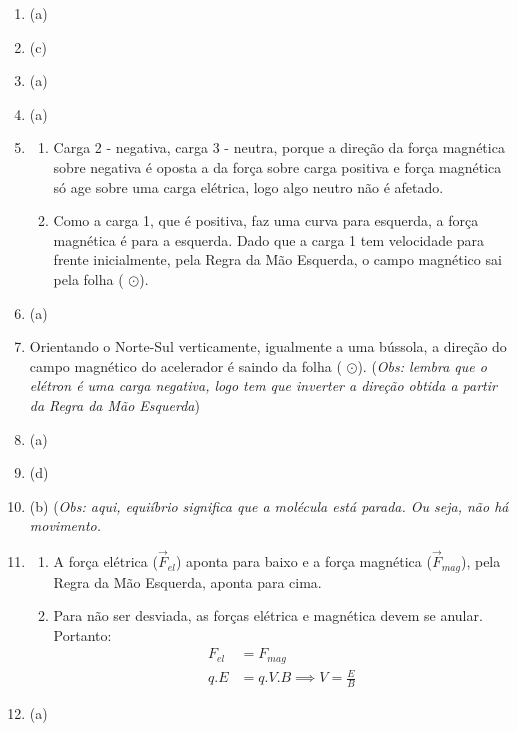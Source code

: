 \documentclass[12pt,letterpaper,fleqn]{article}
\begin{document}
\begin{itemize}
        \begin{enumerate}
            \item (a)
            \item (c)
            \item (a)
            \item (a)
            \item 
            \begin{enumerate}
                \item Carga 2 - negativa, carga 3 - neutra, porque a direção da força magnética sobre negativa é oposta a da força sobre carga positiva e força magnética só age sobre uma carga elétrica, logo algo neutro não é afetado.
                \item Como a carga 1, que é positiva, faz uma curva para esquerda, a força magnética é para a esquerda. Dado que a carga 1 tem velocidade para frente inicialmente, pela Regra da Mão Esquerda, o campo magnético sai pela folha ( $\odot$).
            \end{enumerate}
            \item (a)
            \item Orientando o Norte-Sul verticamente, igualmente a uma bússola, a direção do campo magnético do acelerador é saindo da folha ( $\odot$). (\textit{Obs: lembra que o elétron é uma carga negativa, logo tem que inverter a direção obtida a partir da Regra da Mão Esquerda})
            \item (a)
            \item (d)
            \item (b) (\textit{Obs: aqui, equiíbrio significa que a molécula está parada. Ou seja, não há movimento.}
            \item \begin{enumerate}
                \item A força elétrica ($\vec{F}_{el}$) aponta para baixo e a força magnética ($\vec{F}_{mag}$), pela Regra da Mão Esquerda, aponta para cima.
                \item Para não ser desviada, as forças elétrica e magnética devem se anular. Portanto:
                \begin{align*}
                    F_{el}&=F_{mag} \\
                    q.E &= q.V.B \implies V = \frac{E}{B}
                \end{align*}
            \end{enumerate}
            \item (a)

\end{enumerate}
\end{itemize}
\end{document}
